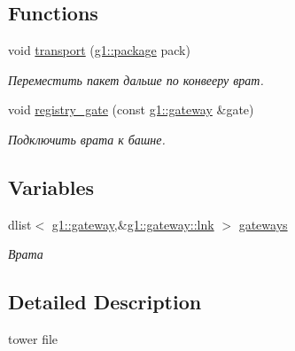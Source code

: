 \subsection*{Functions}
\begin{DoxyCompactItemize}
\item 
void \hyperlink{namespaceg1_a7fbcb90d84ad4b1dcdd2c09eac9c539c}{transport} (\hyperlink{structg1_1_1package}{g1\+::package} pack)\hypertarget{namespaceg1_a7fbcb90d84ad4b1dcdd2c09eac9c539c}{}\label{namespaceg1_a7fbcb90d84ad4b1dcdd2c09eac9c539c}

\begin{DoxyCompactList}\small\item\em Переместить пакет дальше по конвееру врат. \end{DoxyCompactList}\item 
void \hyperlink{namespaceg1_a750f6bfd94ccc8b6f47fc4fa94dd13bf}{registry\+\_\+gate} (const \hyperlink{structg1_1_1gateway}{g1\+::gateway} \&gate)\hypertarget{namespaceg1_a750f6bfd94ccc8b6f47fc4fa94dd13bf}{}\label{namespaceg1_a750f6bfd94ccc8b6f47fc4fa94dd13bf}

\begin{DoxyCompactList}\small\item\em Подключить врата к башне. \end{DoxyCompactList}\end{DoxyCompactItemize}
\subsection*{Variables}
\begin{DoxyCompactItemize}
\item 
dlist$<$ \hyperlink{structg1_1_1gateway}{g1\+::gateway},\&\hyperlink{structg1_1_1gateway_a9b30f9f8c97681eb9b8ce01594200916}{g1\+::gateway\+::lnk} $>$ \hyperlink{namespaceg1_a93a375fa1e7f88aa016b460f659ee244}{gateways}\hypertarget{namespaceg1_a93a375fa1e7f88aa016b460f659ee244}{}\label{namespaceg1_a93a375fa1e7f88aa016b460f659ee244}

\begin{DoxyCompactList}\small\item\em Врата \end{DoxyCompactList}\end{DoxyCompactItemize}


\subsection{Detailed Description}
tower file 

